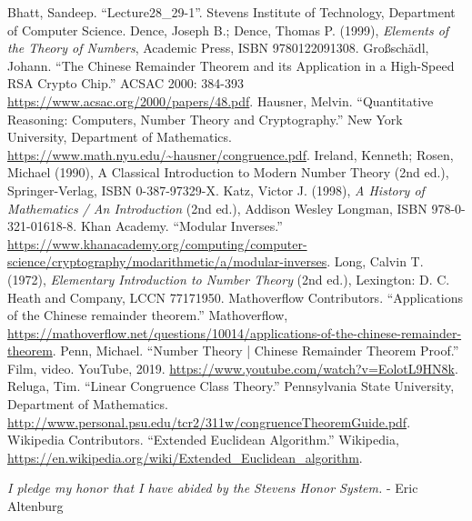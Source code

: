 \documentclass[12pt,a4paper,reqno,parskip=full]{amsart}
\numberwithin{equation}{section}
\theoremstyle{plain}
\theoremstyle{definition}
\begin{document}
\begin{thebibliography}{10}
Bhatt, Sandeep. ``Lecture28\_29-1''. Stevens Institute of Technology, Department of Computer Science.
 Dence, Joseph B.; Dence, Thomas P. (1999), \textit{Elements of the Theory of Numbers}, Academic Press, ISBN 9780122091308.
Großschädl, Johann. ``The Chinese Remainder Theorem and its Application in a High-Speed RSA Crypto Chip.'' ACSAC 2000: 384-393 \url{https://www.acsac.org/2000/papers/48.pdf}.
 Hausner, Melvin. ``Quantitative Reasoning: Computers, Number Theory and Cryptography.'' New York University, Department of Mathematics. \url{https://www.math.nyu.edu/~hausner/congruence.pdf}.
Ireland, Kenneth; Rosen, Michael (1990), A Classical Introduction to Modern Number Theory (2nd ed.), Springer-Verlag, ISBN 0-387-97329-X.
Katz, Victor J. (1998), \textit{A History of Mathematics / An Introduction} (2nd ed.), Addison Wesley Longman, ISBN 978-0-321-01618-8.
Khan Academy. ``Modular Inverses.'' \url{https://www.khanacademy.org/computing/computer-science/cryptography/modarithmetic/a/modular-inverses}.
Long, Calvin T. (1972), \textit{Elementary Introduction to Number Theory} (2nd ed.), Lexington: D. C. Heath and Company, LCCN 77171950.
Mathoverflow Contributors. ``Applications of the Chinese remainder theorem.'' Mathoverflow, \url{https://mathoverflow.net/questions/10014/applications-of-the-chinese-remainder-theorem}.
Penn, Michael. ``Number Theory | Chinese Remainder Theorem Proof.'' Film, video. YouTube, 2019. \url{https://www.youtube.com/watch?v=EolotL9HN8k}.
Reluga, Tim. ``Linear Congruence Class Theory.'' Pennsylvania State University, Department of Mathematics. \url{http://www.personal.psu.edu/tcr2/311w/congruenceTheoremGuide.pdf}.
Wikipedia Contributors. ``Extended Euclidean Algorithm.'' Wikipedia, \url{https://en.wikipedia.org/wiki/Extended_Euclidean_algorithm}.

\end{thebibliography}
{\vspace*{\fill}}
\textit{I pledge my honor that I have abided by the Stevens Honor System.} - Eric Altenburg
\end{document}
